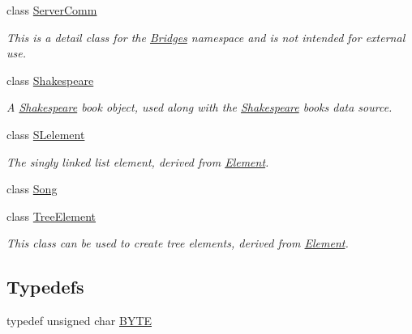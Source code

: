 \begin{DoxyCompactItemize}
class \mbox{\hyperlink{classbridges_1_1_server_comm}{Server\+Comm}}
\begin{DoxyCompactList}\small\item\em This is a detail class for the \mbox{\hyperlink{namespacebridges_1_1_bridges}{Bridges}} namespace and is not intended for external use. \end{DoxyCompactList}\item 
class \mbox{\hyperlink{classbridges_1_1_shakespeare}{Shakespeare}}
\begin{DoxyCompactList}\small\item\em A \mbox{\hyperlink{classbridges_1_1_shakespeare}{Shakespeare}} book object, used along with the \mbox{\hyperlink{classbridges_1_1_shakespeare}{Shakespeare}} books data source. \end{DoxyCompactList}\item 
class \mbox{\hyperlink{classbridges_1_1_s_lelement}{S\+Lelement}}
\begin{DoxyCompactList}\small\item\em The singly linked list element, derived from \mbox{\hyperlink{classbridges_1_1_element}{Element}}. \end{DoxyCompactList}\item 
class \mbox{\hyperlink{classbridges_1_1_song}{Song}}
\item 
class \mbox{\hyperlink{classbridges_1_1_tree_element}{Tree\+Element}}
\begin{DoxyCompactList}\small\item\em This class can be used to create tree elements, derived from \mbox{\hyperlink{classbridges_1_1_element}{Element}}. \end{DoxyCompactList}\end{DoxyCompactItemize}
\subsection*{Typedefs}
\begin{DoxyCompactItemize}
\item 
typedef unsigned char \mbox{\hyperlink{namespacebridges_a59b77ee45243ba85c701fb8ab298ef00}{B\+Y\+TE}}
\end{DoxyCompactItemize}
